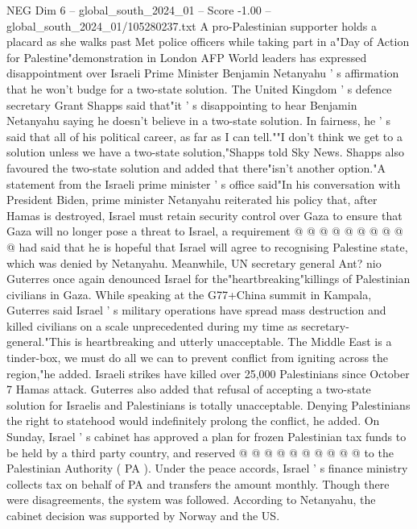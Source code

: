 \begin{textsample}{NEG Dim 6 – global\_south\_2024\_01 – Score -1.00 – global\_south\_2024\_01/105280237.txt}  \label{ex:f6_neg_368}
A pro-Palestinian supporter holds a placard as she walks past Met police officers while taking part in a"Day of Action for Palestine"demonstration in London AFP World leaders has expressed disappointment over Israeli Prime Minister Benjamin Netanyahu ' s affirmation that he won't budge for a two-state solution.
The United Kingdom ' s defence secretary Grant Shapps said that"it ' s disappointing to hear Benjamin Netanyahu saying he doesn't believe in a two-state solution.
In fairness, he ' s said that all of his political career, as far as I can tell.""I don't think we get to a solution unless we have a two-state solution,"Shapps told Sky News.
Shapps also favoured the two-state solution and added that there"isn't another option."A statement from the Israeli prime minister ' s office said"In his conversation with President Biden, prime minister Netanyahu reiterated his policy that, after Hamas is destroyed, Israel must retain security control over Gaza to ensure that Gaza will no longer pose a threat to Israel, a requirement @ @ @ @ @ @ @ @ @ @ had said that he is hopeful that Israel will agree to recognising Palestine state, which was denied by Netanyahu.
Meanwhile, UN secretary general Ant? nio Guterres once again denounced Israel for the"heartbreaking"killings of Palestinian civilians in Gaza.
While speaking at the G77+China summit in Kampala, Guterres said Israel ' s military operations have spread mass destruction and killed civilians on a scale unprecedented during my time as secretary-general."This is heartbreaking and utterly unacceptable.
The Middle East is a tinder-box, we must do all we can to prevent conflict from igniting across the region,"he added.
Israeli strikes have killed over 25,000 Palestinians since October 7 Hamas attack.
Guterres also added that refusal of accepting a two-state solution for Israelis and Palestinians is totally unacceptable.
Denying Palestinians the right to statehood would indefinitely prolong the conflict, he added.
On Sunday, Israel ' s cabinet has approved a plan for frozen Palestinian tax funds to be held by a third party country, and reserved @ @ @ @ @ @ @ @ @ @ to the Palestinian Authority ( PA ).
Under the peace accords, Israel ' s finance ministry collects tax on behalf of PA and transfers the amount monthly.
Though there were disagreements, the system was followed.
According to Netanyahu, the cabinet decision was supported by Norway and the US.

\end{textsample}
